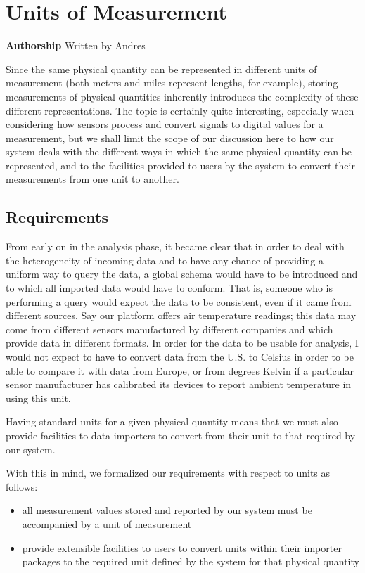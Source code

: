 \section{Units of Measurement}\label{units-of-measurement}

\textbf{Authorship} Written by Andres

Since the same physical quantity can be represented in different units
of measurement (both meters and miles represent lengths, for example),
storing measurements of physical quantities inherently introduces the
complexity of these different representations. The topic is certainly
quite interesting, especially when considering how sensors process and
convert signals to digital values for a measurement, but we shall limit
the scope of our discussion here to how our system deals with the
different ways in which the same physical quantity can be represented,
and to the facilities provided to users by the system to convert their
measurements from one unit to another.

\subsection{Requirements}\label{requirements}

From early on in the analysis phase, it became clear that in order to
deal with the heterogeneity of incoming data and to have any chance of
providing a uniform way to query the data, a global schema would have to
be introduced and to which all imported data would have to conform. That
is, someone who is performing a query would expect the data to be
consistent, even if it came from different sources. Say our platform
offers air temperature readings; this data may come from different
sensors manufactured by different companies and which provide data in
different formats. In order for the data to be usable for analysis, I
would not expect to have to convert data from the U.S. to Celsius in
order to be able to compare it with data from Europe, or from degrees
Kelvin if a particular sensor manufacturer has calibrated its devices to
report ambient temperature in using this unit.

Having standard units for a given physical quantity means that we must
also provide facilities to data importers to convert from their unit to
that required by our system.

With this in mind, we formalized our requirements with respect to units
as follows:

\begin{itemize}
\tightlist
\item
  all measurement values stored and reported by our system must be
  accompanied by a unit of measurement
\item
  provide extensible facilities to users to convert units within their
  importer packages to the required unit defined by the system for that
  physical quantity
\end{itemize}

